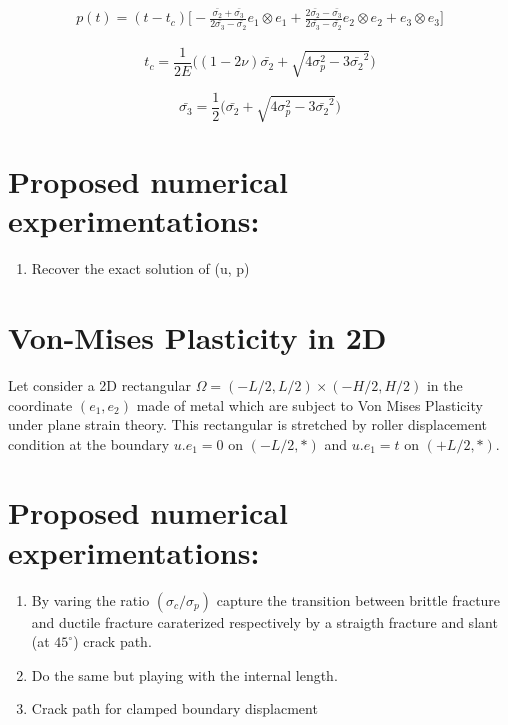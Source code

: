 \documentclass[10pt,oneside]{memoir}
\begin{document}
\begin{equation}
\begin{split}
\label{eq:UsolVonMises3D}
p(t)= (t-t_c) \Big[ -\frac{\bar{\sigma_2}+\bar{\sigma_3}}{2\bar{\sigma_3}-\bar{\sigma_2}} e_1 \otimes e_1 + \frac{2\bar{\sigma_2}-\bar{\sigma_3}}{2\bar{\sigma_3}-\bar{\sigma_2}} e_2\otimes e_2 + e_3\otimes e_3 \Big]
\end{split}
\end{equation}


$$t_c = \frac{1}{2E} \Big( (1-2\nu)\bar{\sigma_2} + \sqrt{4\sigma_p^2- 3\bar{\sigma_2}^2} \Big) $$


$$ \bar{\sigma_3}= \frac{1}{2} \Big( \bar{\sigma_2} + \sqrt{4\sigma_p^2-3\bar{\sigma_2}^2} \Big) $$

\section*{Proposed numerical experimentations:}
\begin{enumerate}
\item Recover the exact solution of (u, p)
\end{enumerate}


\section{Von-Mises Plasticity in 2D}
Let consider a 2D rectangular $\Omega= (-L/2,L/2) \times (-H/2,H/2)$ in the coordinate $(e_1, e_2)$ made of metal which are subject to Von Mises Plasticity under plane strain theory. This rectangular is stretched by roller displacement condition at the boundary $u.e_1 = 0$ on $(-L/2,*)$ and $u.e_1 = t$ on $(+L/2,*)$.

\section*{Proposed numerical experimentations:}

\begin{enumerate}
\item By varing the ratio $(\sigma_c/\sigma_p)$ capture the transition between brittle fracture and ductile fracture caraterized respectively by a straigth fracture and slant (at $45^\circ$) crack path.
\item Do the same but playing with the internal length.
\item Crack path for clamped boundary displacment
\end{enumerate}
\end{document}
